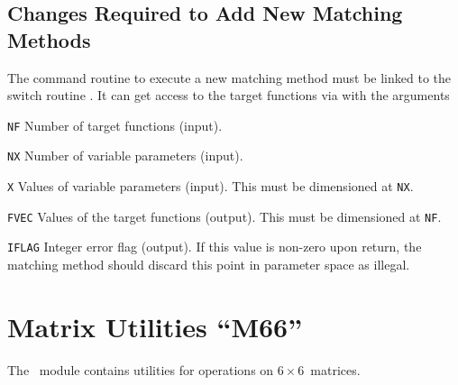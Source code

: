 \section{Changes Required to Add New Matching Methods}
\label{MTMAIN}
The command routine to execute a new matching method must be linked
to the switch routine .
It can get access to the target functions via
with the arguments
\begin{mylist}
\item[\tt NF]
Number of target functions (input).
\item[\tt NX]
Number of variable parameters (input).
\item[\tt X]
Values of variable parameters (input).
This must be dimensioned at {\tt NX}.
\item[\tt FVEC]
Values of the target functions (output).
This must be dimensioned at {\tt NF}.
\item[\tt IFLAG]
Integer error flag (output).
If this value is non-zero upon return,
the matching method should discard this point in parameter space as illegal.
\end{mylist}


\chapter{Matrix Utilities ``M66''}
\label{M66}
The ~module contains utilities for operations on
$6 \times 6$~matrices. 

